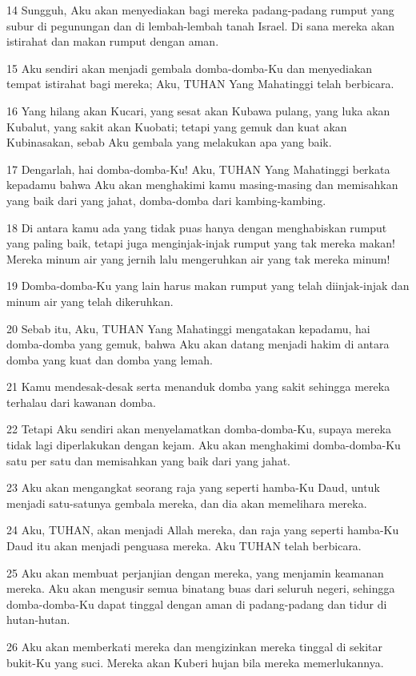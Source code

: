 \par 14 Sungguh, Aku akan menyediakan bagi mereka padang-padang rumput yang subur di pegunungan dan di lembah-lembah tanah Israel. Di sana mereka akan istirahat dan makan rumput dengan aman.
\par 15 Aku sendiri akan menjadi gembala domba-domba-Ku dan menyediakan tempat istirahat bagi mereka; Aku, TUHAN Yang Mahatinggi telah berbicara.
\par 16 Yang hilang akan Kucari, yang sesat akan Kubawa pulang, yang luka akan Kubalut, yang sakit akan Kuobati; tetapi yang gemuk dan kuat akan Kubinasakan, sebab Aku gembala yang melakukan apa yang baik.
\par 17 Dengarlah, hai domba-domba-Ku! Aku, TUHAN Yang Mahatinggi berkata kepadamu bahwa Aku akan menghakimi kamu masing-masing dan memisahkan yang baik dari yang jahat, domba-domba dari kambing-kambing.
\par 18 Di antara kamu ada yang tidak puas hanya dengan menghabiskan rumput yang paling baik, tetapi juga menginjak-injak rumput yang tak mereka makan! Mereka minum air yang jernih lalu mengeruhkan air yang tak mereka minum!
\par 19 Domba-domba-Ku yang lain harus makan rumput yang telah diinjak-injak dan minum air yang telah dikeruhkan.
\par 20 Sebab itu, Aku, TUHAN Yang Mahatinggi mengatakan kepadamu, hai domba-domba yang gemuk, bahwa Aku akan datang menjadi hakim di antara domba yang kuat dan domba yang lemah.
\par 21 Kamu mendesak-desak serta menanduk domba yang sakit sehingga mereka terhalau dari kawanan domba.
\par 22 Tetapi Aku sendiri akan menyelamatkan domba-domba-Ku, supaya mereka tidak lagi diperlakukan dengan kejam. Aku akan menghakimi domba-domba-Ku satu per satu dan memisahkan yang baik dari yang jahat.
\par 23 Aku akan mengangkat seorang raja yang seperti hamba-Ku Daud, untuk menjadi satu-satunya gembala mereka, dan dia akan memelihara mereka.
\par 24 Aku, TUHAN, akan menjadi Allah mereka, dan raja yang seperti hamba-Ku Daud itu akan menjadi penguasa mereka. Aku TUHAN telah berbicara.
\par 25 Aku akan membuat perjanjian dengan mereka, yang menjamin keamanan mereka. Aku akan mengusir semua binatang buas dari seluruh negeri, sehingga domba-domba-Ku dapat tinggal dengan aman di padang-padang dan tidur di hutan-hutan.
\par 26 Aku akan memberkati mereka dan mengizinkan mereka tinggal di sekitar bukit-Ku yang suci. Mereka akan Kuberi hujan bila mereka memerlukannya.
